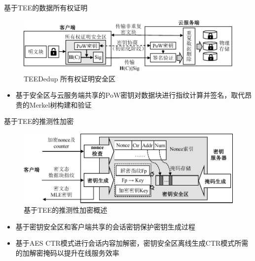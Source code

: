 \documentclass{beamer}
\newcommand{\sysnameS}{TEEDedup }
\begin{document}
\begin{frame}{基于TEE的数据所有权证明}
    \begin{figure}[!htb]
        \centering
        \includegraphics[width=\textwidth]{../pic/sgxdedup/pow.pdf}
        \caption{\sysnameS 所有权证明安全区}
        \label{fig:sgxdedup-overview-pow}
    \end{figure}
    \vspace{-1em}
    \begin{itemize}
        \item  基于安全区与云服务端共享的PoW密钥对数据块进行指纹计算并签名，取代昂贵的Merkel树构建和验证
    \end{itemize}
\end{frame}

\begin{frame}{基于TEE的推测性加密}
    \begin{figure}[!htb]
        \centering
        \includegraphics[width=\textwidth]{../pic/sgxdedup/key-enclave-arch.pdf}
        \caption{基于TEE的推测性加密概述}
        \label{fig:sgxdedup-SpecEnc}
    \end{figure}
    \vspace{-1em}
    \begin{itemize}
        \item  基于密钥安全区和客户端共享的会话密钥保护密钥生成过程
        \item 基于AES CTR模式进行会话内容加解密，密钥安全区离线生成CTR模式所需的加解密掩码以提升在线服务效率
    \end{itemize}
\end{frame}
\end{document}
